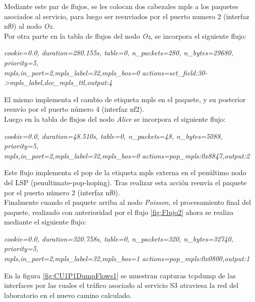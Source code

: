 Mediante este par de flujos, se les colocan dos cabezales mpls a los paquetes asociados al servicio, para luego ser reenviados por el puerto numero 2 (interfaz nf0) al nodo \textit{Oz}.\\

Por otra parte en la tabla de flujos del nodo \textit{Oz}, se incorpora el siguiente flujo:

\begin{center}
\textit{cookie=0.0, duration=280.155s, table=0, n\_packets=280, n\_bytes=29680, priority=5, \\
mpls,in\_port=2,mpls\_label=32,mpls\_bos=0 actions=set\_field:30->mpls\_label,dec\_mpls\_ttl,output:4 }
\end{center}

El mismo implementa el cambio de etiqueta mpls en el paquete, y su posterior reenvío por el puerto n\'umero 4 (interfaz nf2).\\

Luego en la tabla de flujos del nodo \textit{Alice} se incorpora el siguiente flujo:

\begin{center}
\textit{cookie=0.0, duration=48.510s, table=0, n\_packets=48, n\_bytes=5088, priority=5, \\
mpls,in\_port=2,mpls\_label=32,mpls\_bos=0 actions=pop\_mpls:0x8847,output:2 }
\end{center}

Este flujo implementa el pop de la etiqueta mpls externa en el penúltimo nodo del LSP (penultimate-pop-hoping). Tras realizar esta acci\'on reenvía el paquete por el puerto n\'umero 2 (interfaz nf0).\\

Finalmente cuando el paquete arriba al nodo \textit{Poisson}, el procesamiento final del paquete, realizado con anterioridad por el flujo \ref{fig:Flujo2} ahora se realiza mediante el siguiente flujo: 

\begin{center}
\textit{cookie=0.0, duration=320.758s, table=0, n\_packets=320, n\_bytes=32740, priority=5, \\
mpls,in\_port=2,mpls\_label=32,mpls\_bos=1 actions=pop\_mpls:0x0800,output:1 }
\end{center}

En la figura \ref{fig:CU1P1DumpFlows1} se muestran capturas tcpdump de las interfaces por las cuales el tr\'afico asociado al servicio S3 atraviesa la red del laboratorio en el nuevo camino calculado.

